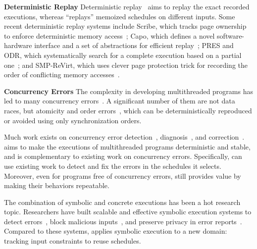 \noindent
{\bf Deterministic Replay} Deterministic
replay~\cite{r2:osdi,friday2007,srinivasan:flashback,revirt,dejavu,vmware-record-replay,smp-revirt:vee08,pres:sosp09,scribe:sigmetrics10,odr:sosp09,capo:asplos09}
aims to replay the exact recorded executions, whereas \tern ``replays''
memoized schedules on different inputs.  Some recent deterministic replay
systems include Scribe, which tracks page ownership to enforce
deterministic memory access~\cite{scribe:sigmetrics10}; Capo, which defines
a novel software-hardware interface and a set of abstractions for
efficient replay~\cite{capo:asplos09}; PRES and ODR, which
systematically search for a complete execution based on a partial
one~\cite{pres:sosp09,odr:sosp09}; and SMP-ReVirt, which uses clever page
protection trick for recording the order of conflicting memory
accesses~\cite{smp-revirt:vee08}.

\noindent
{\bf Concurrency Errors} The complexity in developing multithreaded
programs has led to many concurrency errors~\cite{lu:concurrency-bugs}.  A
significant number of them are not data races, but atomicity and order
errors~\cite{lu:concurrency-bugs}, which can be deterministically
reproduced or avoided using only synchronization orders.

Much work exists on concurrency error
detection~\cite{yu:racetrack:sosp,savage:eraser,racerx:sosp03,lu:muvi:sosp,avio:asplos06,conmem:asplos10},
diagnosis~\cite{racefuzzer:pldi08,ctrigger:asplos09,atomfuzzer:fse08}, and
correction~\cite{dimmunix:osdi08,gadara:osdi08}.  \tern aims to make the
executions of multithreaded programs deterministic and stable, and is
complementary to existing work on concurrency errors.  Specifically,
\tern can use existing work to detect and fix the errors in the schedules
it selects.  Moreover, even for programs free of concurrency errors,
\tern still provides value by making their behaviors repeatable.

 The combination of symbolic and
concrete executions has been a hot research topic.  Researchers have built
scalable and effective symbolic execution systems to detect
errors~\cite{dart:pldi,cute:fse,godefroid:grammar-fuzzing,godefroid:whitebox-fuzzing,klee:osdi08,yang:malicious-disk:oakland06,cadar:exe:ccs06,s2e:hotdep09,taas:socc10},
block malicious inputs~\cite{castro:bouncer}, and preserve privacy in
error reports~\cite{castro:bug-report-privacy}.  Compared to these
systems, \tern applies symbolic execution to a new domain: tracking input
constraints to reuse schedules.

